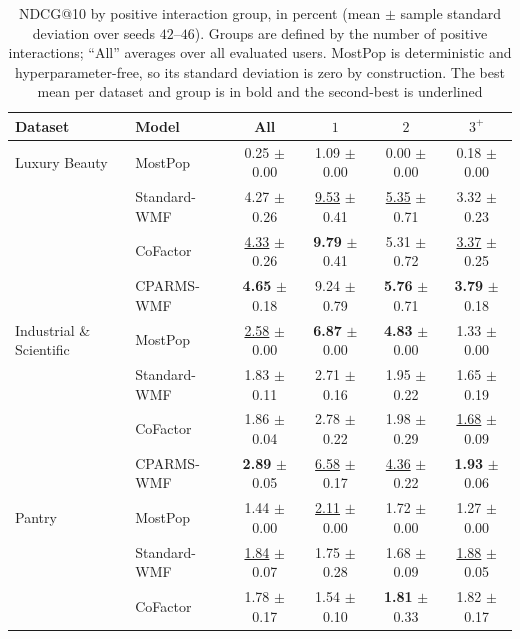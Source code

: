 \documentclass[pdflatex,sn-vancouver-num]{sn-jnl}%
\theoremstyle{thmstyleone}%
\theoremstyle{thmstyletwo}%
\theoremstyle{thmstylethree}%
\begin{document}
\clearpage

\begin{table}
\centering
\caption{NDCG@10 by positive interaction group, in percent (mean $\pm$ sample standard deviation over
seeds $42$--$46$). Groups are defined by the number of positive interactions;
``All'' averages over all evaluated users. MostPop is deterministic and
hyperparameter-free, so its standard deviation is zero by construction. The best mean per
dataset and group is in bold and the second-best is underlined}
\label{tab:ndcg_group}
\small
\renewcommand{\arraystretch}{1.15}
\begin{tabular*}{\textheight}{@{\extracolsep{\fill}}llcccc@{}}
\toprule
Dataset & Model & All & $1$ & $2$ & $3^{+}$ \\
\midrule
Luxury Beauty & MostPop & 0.25 $\pm$ 0.00 & 1.09 $\pm$ 0.00 & 0.00 $\pm$ 0.00 & 0.18 $\pm$ 0.00 \\
              & Standard-WMF & 4.27 $\pm$ 0.26 & \underline{9.53} $\pm$ 0.41 & \underline{5.35} $\pm$ 0.71 & 3.32 $\pm$ 0.23 \\
              & CoFactor & \underline{4.33} $\pm$ 0.26 & \textbf{9.79} $\pm$ 0.41 & 5.31 $\pm$ 0.72 & \underline{3.37} $\pm$ 0.25 \\
              & CPARMS-WMF & \textbf{4.65} $\pm$ 0.18 & 9.24 $\pm$ 0.79 & \textbf{5.76} $\pm$ 0.71 & \textbf{3.79} $\pm$ 0.18 \\
\midrule
Industrial \& Scientific & MostPop & \underline{2.58} $\pm$ 0.00 & \textbf{6.87} $\pm$ 0.00 & \textbf{4.83} $\pm$ 0.00 & 1.33 $\pm$ 0.00 \\
              & Standard-WMF & 1.83 $\pm$ 0.11 & 2.71 $\pm$ 0.16 & 1.95 $\pm$ 0.22 & 1.65 $\pm$ 0.19 \\
              & CoFactor & 1.86 $\pm$ 0.04 & 2.78 $\pm$ 0.22 & 1.98 $\pm$ 0.29 & \underline{1.68} $\pm$ 0.09 \\
              & CPARMS-WMF & \textbf{2.89} $\pm$ 0.05 & \underline{6.58} $\pm$ 0.17 & \underline{4.36} $\pm$ 0.22 & \textbf{1.93} $\pm$ 0.06 \\
\midrule
Pantry        & MostPop & 1.44 $\pm$ 0.00 & \underline{2.11} $\pm$ 0.00 & 1.72 $\pm$ 0.00 & 1.27 $\pm$ 0.00 \\
              & Standard-WMF & \underline{1.84} $\pm$ 0.07 & 1.75 $\pm$ 0.28 & 1.68 $\pm$ 0.09 & \underline{1.88} $\pm$ 0.05 \\
              & CoFactor & 1.78 $\pm$ 0.17 & 1.54 $\pm$ 0.10 & \textbf{1.81} $\pm$ 0.33 & 1.82 $\pm$ 0.17 \\

\end{tabular*}
\end{table}
\end{document}
